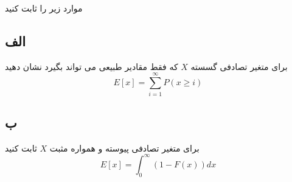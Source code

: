 
 موارد زیر را ثابت کنید

\subsection*{الف}
برای متغیر تصادفی گسسته $X$ که فقط مقادیر طبیعی می تواند بگیرد نشان دهید
$$E[x] = \sum_{i = 1}^{\infty} P(x \geq i)$$
\subsection*{ب}
برای متغیر تصادفی پیوسته و همواره مثبت $X$ ثابت کنید
$$E[x] = \int_{0}^{\infty} (1  - F(x))dx$$

